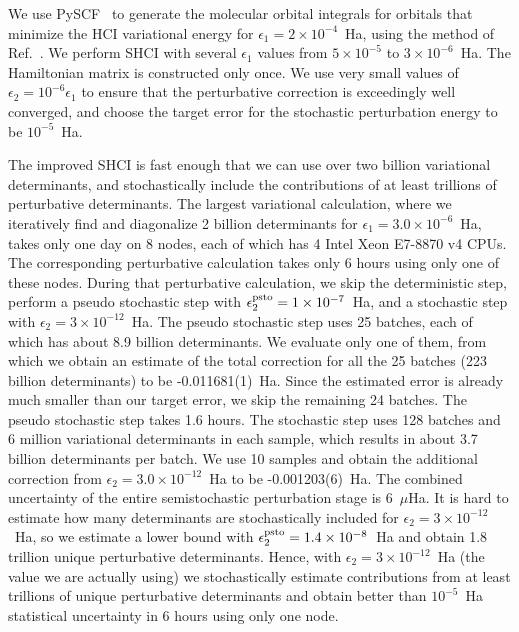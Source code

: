 \documentclass[%
reprint,
 superscriptaddress,
 amsmath,amssymb,
 aps,
]{revtex4-1}
\begin{document}
We use PySCF~\cite{SunCha_etal_PySCF-ComMolSci-18} to generate the molecular orbital integrals for orbitals that minimize the HCI variational
energy for $\epsilon_1=2\times 10^{-4}$~Ha, using the method of Ref.~\cite{SmiMusHolSha-JCTC-17}.
We perform SHCI with several $\epsilon_1$ values from $5\times10^{-5}$ to $3\times10^{-6}$~Ha.
The Hamiltonian matrix is constructed only once.
We use very small values of $\epsilon_2 = 10^{-6} \epsilon_1$  to ensure that the perturbative correction is exceedingly well converged,
and choose the target error for the stochastic perturbation energy to be $10^{-5}$~Ha.

The improved SHCI is fast enough that we can use over two billion variational determinants, and stochastically include the contributions of at least trillions of perturbative determinants.
The largest variational calculation, where we iteratively find and diagonalize 2 billion determinants
for $\epsilon_1=3.0\times10^{-6}$~Ha, takes only one day on 8 nodes, each of which has 4 Intel Xeon E7-8870 v4 CPUs.
The corresponding perturbative calculation takes only 6 hours using only one of these nodes. 
During that perturbative calculation, we skip the deterministic step, perform a pseudo stochastic step with $\epsilon_2^{\rm psto}=1\times10^{-7}$~Ha, and a stochastic step with $\epsilon_2=3\times10^{-12}$~Ha.
The pseudo stochastic step uses 25 batches, each of which has about 8.9 billion determinants.
We evaluate only one of them, from which we obtain an estimate of the total correction for all the 25 batches (223 billion determinants) to be -0.011681(1)~Ha.
Since the estimated error is already much smaller than our target error, we skip the remaining 24 batches.
The pseudo stochastic step takes 1.6 hours.
The stochastic step uses 128 batches and 6 million variational determinants in each sample,
which results in about 3.7 billion determinants per batch.
We use 10 samples and obtain the additional correction from $\epsilon_2=3.0\times10^{-12}$~Ha to be -0.001203(6)~Ha.
The combined uncertainty of the entire semistochastic perturbation stage is 6~$\mu$Ha.
It is hard to estimate how many determinants are stochastically included for $\epsilon_2=3\times10^{-12}$~Ha,
so we estimate a lower bound with $\epsilon_2^{\rm psto}=1.4\times10^{-8}$~Ha and obtain 1.8 trillion unique perturbative determinants.
Hence, with $\epsilon_2=3\times10^{-12}$~Ha (the value we are actually using) we stochastically estimate contributions from
at least trillions of unique perturbative determinants and obtain better than $10^{-5}$~Ha statistical uncertainty in 6 hours using only one node.
\end{document}
